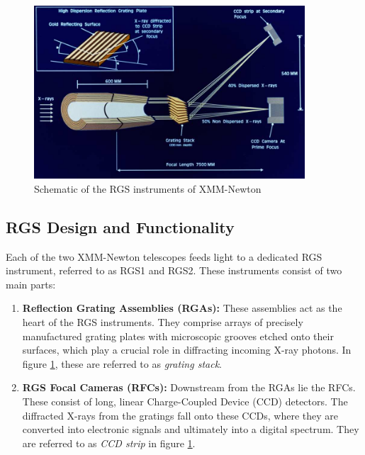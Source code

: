 		\begin{figure}[!htb]
			\centering
			\includegraphics[width=0.9\textwidth]{xmm-rgs.png}
			\caption{Schematic of the RGS instruments of XMM-Newton}
			\label{xmm-rgs-instrument}
		\end{figure}
		
		\subsection{RGS Design and Functionality}			
			Each of the two XMM-Newton telescopes feeds light to a dedicated RGS instrument, referred to as RGS1 and RGS2. These instruments consist of two main parts:
			\begin{enumerate}
				\item \textbf{Reflection Grating Assemblies (RGAs):} These assemblies act as the heart of the RGS instruments. They comprise arrays of precisely manufactured grating plates with microscopic grooves etched onto their surfaces, which play a crucial role in diffracting incoming X-ray photons. In figure \ref{xmm-rgs-instrument}, these are referred to as \emph{grating stack}.
				
				\item \textbf{RGS Focal Cameras (RFCs):} Downstream from the RGAs lie the RFCs. These consist of long, linear Charge-Coupled Device (CCD) detectors. The diffracted X-rays from the gratings fall onto these CCDs, where they are converted into electronic signals and ultimately into a digital spectrum. They are referred to as \emph{CCD strip} in figure \ref{xmm-rgs-instrument}.
			\end{enumerate}
		
